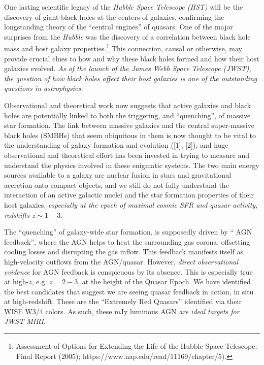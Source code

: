 One lasting scientific legacy of the {\it Hubble Space Telescope
(HST)} will be the discovery of giant black holes at the centers of
galaxies, confirming the longstanding theory of the ``central
engines'' of quasars.  One of the major surprises from the {\it
Hubble} was the discovery of a correlation between black hole mass and
host galaxy properties.\footnote{Assessment of Options for Extending
the Life of the Hubble Space Telescope: Final Report (2005);
https://www.nap.edu/read/11169/chapter/5).}  This connection, causal
or otherwise, may provide crucial clues to how and why these black
holes formed and how their host galaxies evolved. {\it As of the
launch of the James Webb Space Telescope (JWST), the question of how
black holes affect their host galaxies is one of the outstanding
questions in astrophysics.}

\smallskip \smallskip
\noindent
Observational and theoretical work now suggests that active galaxies
and black holes are potentially linked to both the triggering, and
``quenching'', of massive star formation. The link between massive
galaxies and the central super-massive black holes (SMBHs) that seem
ubiquitous in them is now thought to be vital to the understanding of
galaxy formation and evolution ([1], [2]), and huge observational and
theoretical effort has been invested in trying to measure and
understand the physics involved in these enigmatic systems.  The two
main energy sources available to a galaxy are nuclear fusion in stars
and gravitational accretion onto compact objects, and we still do not
fully understand the interaction of an active galactic nuclei and the
star formation properties of their host galaxies, {\it especially at
the epoch of maximal cosmic SFR and quasar activity, redshifts $z\sim1-3$.}

\smallskip \smallskip
\noindent
The ``quenching'' of galaxy-wide star formation, is supposedly driven
by `` AGN feedback'', where the AGN helps to heat the surrounding gas
corona, offsetting cooling losses and disrupting the gas inflow. This
feedback manifests itself as high-velocity outflows from the
AGN/quasar.  However, {\it direct observational evidence} for AGN
feedback is conspicuous by its absence. This is especially true at
high-$z$, e.g. $z=2-3$, at the height of the Quasar Epoch.  We have
identified the best candidates that suggest we are seeing quasar
feedback in action, in situ at high-redshift. These are the
``Extremely Red Quasars'' identified via their WISE W3/4 colors.  As
such, these mJy luminous AGN {\it are ideal targets for JWST
MIRI}.

